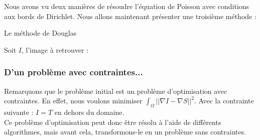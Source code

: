 Nous avons vu deux manières de résoudre l'équation de Poisson avec conditions aux bords de Dirichlet. Nous allons maintenant présenter une troisième méthode  : \\
\begin{center}
Le méthode de Douglas
\end{center}
Soit $I$, l'image à retrouver : 
\subsubsection{D'un problème avec contraintes...}
Remarquons que le problème initial est un problème d'optimisation avec contraintes. En effet, nous voulons minimiser $\int_\Omega ||\nabla I-\nabla S||^2$. Avec la contrainte suivante : $I = T$ en dehors du domaine. \\
Ce problème d'optimisation peut donc être résolu à l'aide de différents algorithmes, mais avant cela, transformons-le en un problème sans contraintes. 

